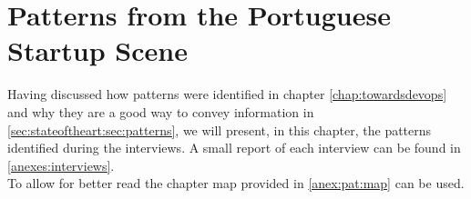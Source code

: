 \chapter{Patterns from the Portuguese Startup Scene} \label{chap:patterns}
		Having discussed how patterns were identified in chapter \ref{chap:towardsdevops} and why they are a good way to convey information in \ref{sec:stateoftheart:sec:patterns}, we will present, in this chapter, the patterns identified during the interviews. A small report of each interview can be found in \ref{anexes:interviews}. \\
		To allow for better read the chapter map provided in \ref{anex:pat:map} can be used.











